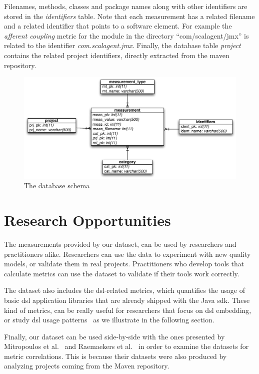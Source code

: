 \documentclass{sig-alternate}
\begin{document}
Filenames, methods, classes and package names along with other identifiers are stored in the \textit{identifiers} table. Note that each measurement has a related filename and a related identifier that points to a software element. For example the \textit{afferent coupling} metric for the module in the directory ``com/scalagent/jmx'' is related to the identifier \textit{com.scalagent.jmx}.
Finally, the database table \textit{project} contains the related project identifiers, directly extracted from the maven repository.

\begin{figure}
\centering
\includegraphics[scale=0.7]{database-schema}
\caption{The database schema}
\label{fig:database-schema}
\end{figure}

\section{Research Opportunities}
\label{sec:research-opportunities}

The measurements provided by our dataset, can be used by researchers and practitioners alike. Researchers can use the data to experiment with new quality models, or validate them in real projects. Practitioners who develop tools that calculate metrics can use the dataset to validate if their tools work correctly.

The dataset also includes the {\sc dsl}-related metrics, which quantifies the usage of basic {\sc dsl} application libraries that are already shipped with the Java {\sc sdk}. These kind of metrics, can be really useful for researchers that focus on {\sc dsl} embedding, or study {\sc dsl} usage patterns~\cite{KARA14} as we illustrate in the following section.

Finally, our dataset can be used side-by-side with the ones presented by Mitropoulos et al.~\cite{HP04} and Raemaekers et al.~\cite{RDV13} in order to examine the datasets for metric correlations. This is because their datasets were also produced by analyzing projects coming from the Maven repository.
\end{document}
